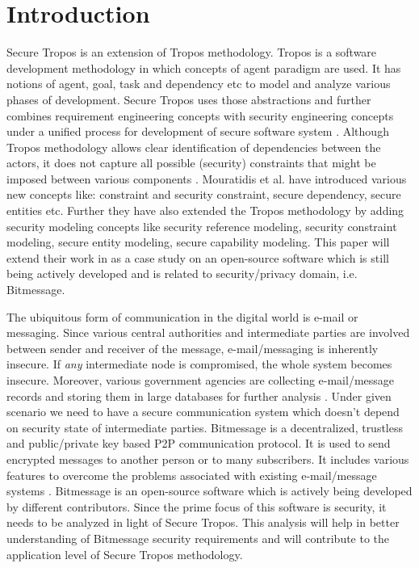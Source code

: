 \documentclass{acm_proc_article-sp}
\begin{document}
\section{Introduction}
Secure Tropos is an extension of Tropos methodology. Tropos is a software development methodology in which concepts of agent paradigm are used. It has notions of agent, goal, task and dependency etc to model and analyze various phases of development. Secure Tropos uses those abstractions and further combines requirement engineering concepts with security engineering concepts under a unified process for development of secure software system \cite{Mouratidis06securetropos:}. Although Tropos methodology allows clear identification of dependencies between the actors, it does not capture all possible (security) constraints that might be imposed between various components \cite{Mouratidis06securetropos:}. Mouratidis et al. \cite{Mouratidis06securetropos:} have introduced various new concepts like: constraint and security constraint, secure dependency, secure entities etc. Further they have also extended the Tropos methodology by adding security modeling concepts like security reference modeling, security constraint modeling, secure entity modeling, secure capability modeling. %
This paper will extend their work in as a case study on an open-source software which is still being actively developed and is related to security/privacy domain, i.e. Bitmessage.


\par

The ubiquitous form of communication in the digital world is e-mail or messaging. Since various central authorities and intermediate parties are involved between sender and receiver of the message, e-mail/messaging is inherently insecure. If \emph{any} intermediate node is compromised, the whole system becomes insecure. Moreover, various government agencies are collecting e-mail/message records and storing them in large databases for further analysis \cite{JW12}.  Under given scenario we need to have a secure communication system which doesn't depend on security state of intermediate parties. Bitmessage is a decentralized, trustless and public/private key based P2P communication protocol. It is used to send encrypted messages to another person or to many subscribers. It includes various features to overcome the problems associated with existing e-mail/message systems \cite{JW12}. Bitmessage is an open-source software which is actively being developed by different contributors. Since the prime focus of this software is security, it needs to be analyzed in light of Secure Tropos. This analysis will help in better understanding of Bitmessage security requirements and will contribute to the application level of Secure Tropos methodology.
\end{document}

